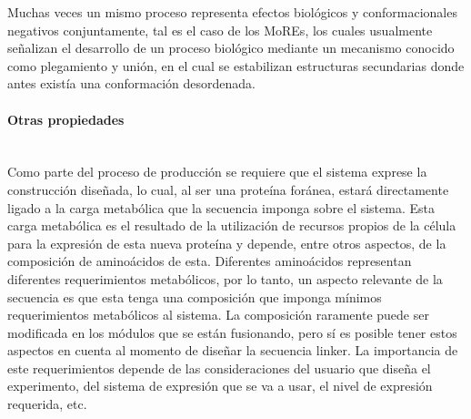 Muchas veces un mismo proceso representa efectos biológicos y conformacionales negativos conjuntamente, tal es el caso de los MoREs, los cuales usualmente señalizan 
el desarrollo de un proceso biológico mediante un mecanismo conocido como plegamiento y unión, en el cual se estabilizan estructuras secundarias donde antes existía una conformación desordenada.



\paragraph{Otras propiedades} \hspace{0pt} \\ \indent 
Como parte del proceso de producción se requiere que el sistema exprese la construcción diseñada, lo cual, al ser una proteína foránea, estará directamente ligado a la carga
metabólica que la secuencia imponga sobre el sistema\cite{glick1995metabolic}. Esta carga metabólica es el resultado de la utilización de recursos propios de la célula para la expresión de esta nueva proteína y depende, entre otros aspectos, 
de la composición de aminoácidos de esta. 
Diferentes aminoácidos representan diferentes requerimientos metabólicos, por lo tanto, un aspecto relevante de la secuencia es que esta tenga una composición que imponga mínimos requerimientos metabólicos al sistema. 
La composición raramente puede ser modificada en los módulos que se están fusionando, pero sí es posible tener estos aspectos en cuenta al momento de diseñar la secuencia linker. La importancia de este requerimientos depende de las consideraciones del usuario que diseña el experimento, del sistema de expresión que se va a usar, el nivel de expresión requerida, etc.


